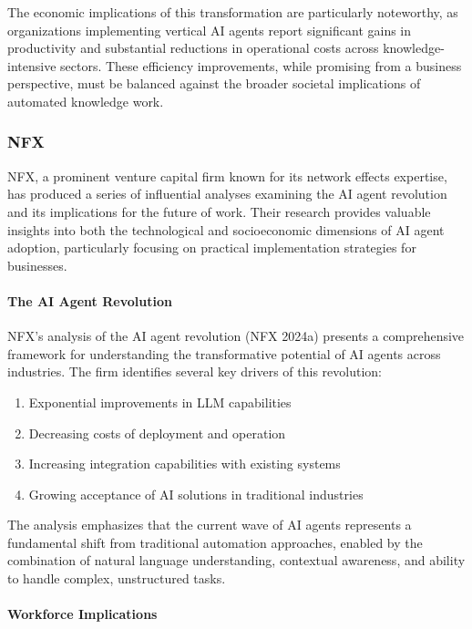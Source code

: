 \documentclass[
]{article}
\providecommand{\tightlist}{%
  \setlength{\itemsep}{0pt}\setlength{\parskip}{0pt}}
\begin{document}
The economic implications of this transformation are particularly
noteworthy, as organizations implementing vertical AI agents report
significant gains in productivity and substantial reductions in
operational costs across knowledge-intensive sectors. These efficiency
improvements, while promising from a business perspective, must be
balanced against the broader societal implications of automated
knowledge work.

\subsubsection{NFX}\label{nfx}

NFX, a prominent venture capital firm known for its network effects
expertise, has produced a series of influential analyses examining the
AI agent revolution and its implications for the future of work. Their
research provides valuable insights into both the technological and
socioeconomic dimensions of AI agent adoption, particularly focusing on
practical implementation strategies for businesses.

\paragraph{The AI Agent Revolution}\label{the-ai-agent-revolution}

NFX's analysis of the AI agent revolution (NFX 2024a) presents a
comprehensive framework for understanding the transformative potential
of AI agents across industries. The firm identifies several key drivers
of this revolution:

\begin{enumerate}
\def\labelenumi{\arabic{enumi}.}
\tightlist
\item
  Exponential improvements in LLM capabilities
\item
  Decreasing costs of deployment and operation
\item
  Increasing integration capabilities with existing systems
\item
  Growing acceptance of AI solutions in traditional industries
\end{enumerate}

The analysis emphasizes that the current wave of AI agents represents a
fundamental shift from traditional automation approaches, enabled by the
combination of natural language understanding, contextual awareness, and
ability to handle complex, unstructured tasks.

\paragraph{Workforce Implications}\label{workforce-implications}
\end{document}
